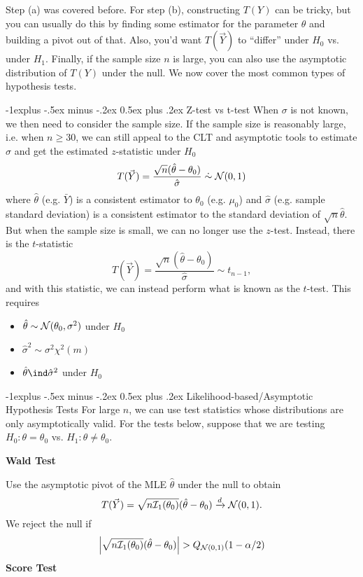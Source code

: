 \documentclass[10pt,landscape]{article}
\makeatletter
\renewcommand{\subsection}{\@startsection{subsection}{2}{0mm}%
                                {-1explus -.5ex minus -.2ex}%
                                {0.5ex plus .2ex}%
                                {\normalfont\normalsize\bfseries}}
\makeatother
\begin{document}
\begin{multicols*}{3}
Step (a) was covered before. For step (b), constructing $T(Y)$ can be tricky, but you can usually do this by finding some estimator for the parameter $\theta$ and building a pivot out of that. Also, you'd want $T(\vec Y)$ to ``differ'' under $H_0$ vs. under $H_1$. Finally, if the sample size $n$ is large, you can also use the asymptotic distribution of $T(Y)$ under the null. We now cover the most common types of hypothesis tests.

\subsection{Z-test vs t-test}
When $\sigma$ is not known, we then need to consider the sample size. If the sample size is reasonably large, i.e. when $n\geq 30$, we can still appeal to the CLT and asymptotic tools to estimate $\sigma$ and get the estimated $z$-statistic under $H_0$ $$T(\vec Y) =\frac{\sqrt{n}(\hat{\theta}-\theta_0)}{\hat\sigma}\mathrel{\dot\sim} \mathcal{N}(0,1)$$
where $\hat\theta$ (e.g. $\bar Y$) is a consistent estimator to $\theta_0$ (e.g. $\mu_0$) and $\hat \sigma$ (e.g. sample standard deviation) is a consistent estimator to the standard deviation of $\sqrt{n}\hat \theta$. But when the sample size is small, we can no longer use the $z$-test. Instead, there is the $t$-statistic $$T(\vec Y)=\frac{\sqrt{n}(\hat\theta-\theta_0)}{\hat\sigma}\sim t_{n-1},$$ and with this statistic, we can instead perform what is known as the $t$-test. This requires
\begin{itemize}
    \item $\hat\theta\sim\mathcal{N}(\theta_0,\sigma^2)$ under $H_0$
    \item $\hat\sigma^2\sim \sigma^2\chi^2(m)$
    \item $\hat\theta\ind\hat\sigma^2$ under $H_0$
\end{itemize}

\subsection{Likelihood-based/Asymptotic Hypothesis Tests}
For large $n$, we can use test statistics whose distributions are only asymptotically valid. For the tests below, suppose that we are testing $H_0:\theta = \theta_0$ vs. $H_1:\theta \neq \theta_0$.

\textbf{Wald Test}

Use the asymptotic pivot of the MLE $\hat{\theta}$ under the null to obtain $$T(\vec Y)=\sqrt{n\mathcal{I}_1(\theta_0)}(\hat{\theta}-\theta_0)\xrightarrow{d}\mathcal{N}(0,1).$$
We reject the null if
$$\left|\sqrt{n\mathcal{I}_1(\theta_0)}(\hat\theta-\theta_0)\right|>Q_{\cN(0,1)}(1-\alpha/2)$$
\textbf{Score Test}


\end{multicols*}
\end{document}
